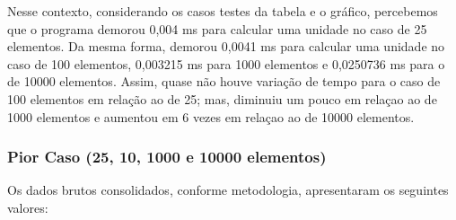 \documentclass[a4paper, 12pt]{article}
\begin{document}
Nesse contexto, considerando os casos testes da tabela e o gráfico, percebemos que o programa demorou 0,004 ms para calcular uma unidade no caso de 25 elementos. Da mesma forma, demorou 0,0041 ms para calcular uma unidade no caso de 100 elementos, 0,003215 ms para 1000 elementos e 0,0250736 ms para o de 10000 elementos. Assim, quase não houve variação de tempo para o caso de 100 elementos em relação ao de 25; mas, diminuiu um pouco em relaçao ao de 1000 elementos e aumentou em 6 vezes em relaçao ao de 10000 elementos.


\subsubsection{Pior Caso (25, 10, 1000 e 10000 elementos)}

Os dados brutos consolidados, conforme metodologia, apresentaram os seguintes valores:
\vspace{0.2cm}
\end{document}

